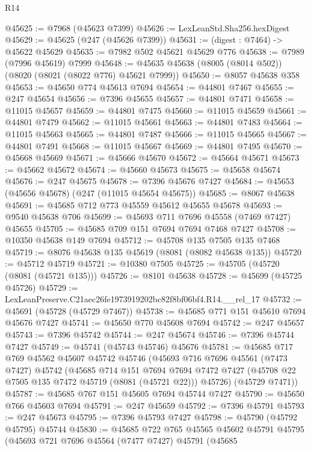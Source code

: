 \begin{lexlean}{R14}
\begin{coremodule}
@45625 := @7968 (@45623 @7399)
@45626 := LexLeanStd.Sha256.hexDigest
@45629 := @45625 (@247 (@45626 @7399))
@45631 := (digest : @7464) -> @45622 @45629
@45635 := @7982 @502 @45621 @45629 @776
@45638 := @7989 (@7996 @45619) @7999
@45648 := @45635 @45638 (@8005 (@8014 @502)) (@8020 (@8021 (@8022 @776) @45621 @7999))
@45650 := @8057 @45638 @358
@45653 := @45650 @774 @45613 @7694
@45654 := @44801 @7467
@45655 := @247 @45654
@45656 := @7396 @45655
@45657 := @44801 @7471
@45658 := @11015 @45657
@45659 := @44801 @7475
@45660 := @11015 @45659
@45661 := @44801 @7479
@45662 := @11015 @45661
@45663 := @44801 @7483
@45664 := @11015 @45663
@45665 := @44801 @7487
@45666 := @11015 @45665
@45667 := @44801 @7491
@45668 := @11015 @45667
@45669 := @44801 @7495
@45670 := @45668 @45669
@45671 := @45666 @45670
@45672 := @45664 @45671
@45673 := @45662 @45672
@45674 := @45660 @45673
@45675 := @45658 @45674
@45676 := @247 @45675
@45678 := @7396 @45676 @7427
@45684 := @45653 (@45656 @45678) (@247 (@11015 @45654 @45675))
@45685 := @8067 @45638
@45691 := @45685 @712 @773 @45559 @45612 @45655 @45678
@45693 := @9540 @45638 @706
@45699 := @45693 @711 @7696 @45558 (@7469 @7427) @45655
@45705 := @45685 @709 @151 @7694 @7694 @7468 @7427
@45708 := @10350 @45638 @149 @7694
@45712 := @45708 @135 @7505 @135 @7468
@45719 := @8076 @45638 @135 @45619 (@8081 (@8082 @45638 @135))
@45720 := @45712 @45719
@45721 := @10380 @7505
@45725 := @45705 (@45720 (@8081 (@45721 @135)))
@45726 := @8101 @45638
@45728 := @45699 (@45725 @45726)
@45729 := LexLeanPreserve.C21aec26fe1973919202bc82f8bf06bf4.R14.__rel_17
@45732 := @45691 (@45728 (@45729 @7467))
@45738 := @45685 @771 @151 @45610 @7694 @45676 @7427
@45741 := @45650 @770 @45608 @7694
@45742 := @247 @45657
@45743 := @7396 @45742
@45744 := @247 @45674
@45746 := @7396 @45744 @7427
@45749 := @45741 (@45743 @45746) @45676
@45781 := @45685
    @717
    @769
    @45562
    @45607
    @45742
    @45746
    (@45693
      @716
      @7696
      @45561
      (@7473 @7427)
      @45742
      (@45685
        @714
        @151
        @7694
        @7694
        @7472
        @7427
        (@45708 @22 @7505 @135 @7472 @45719 (@8081 (@45721 @22)))
        @45726)
      (@45729 @7471))
@45787 := @45685 @767 @151 @45605 @7694 @45744 @7427
@45790 := @45650 @766 @45603 @7694
@45791 := @247 @45659
@45792 := @7396 @45791
@45793 := @247 @45673
@45795 := @7396 @45793 @7427
@45798 := @45790 (@45792 @45795) @45744
@45830 := @45685
    @722
    @765
    @45565
    @45602
    @45791
    @45795
    (@45693
      @721
      @7696
      @45564
      (@7477 @7427)
      @45791
      (@45685

\end{coremodule}
\end{lexlean}
